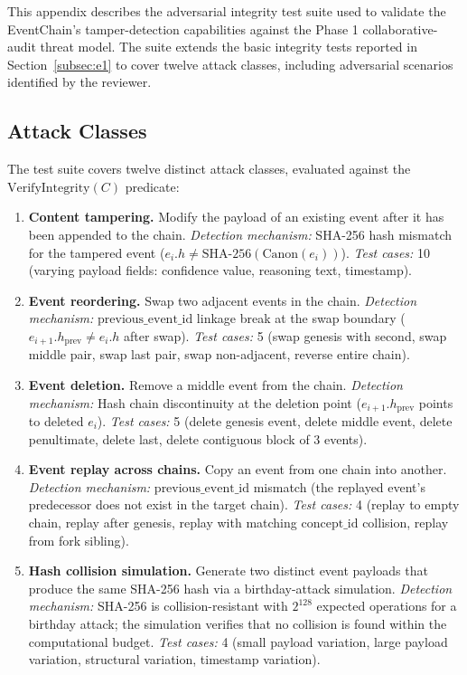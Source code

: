 This appendix describes the adversarial integrity test suite used to validate the EventChain's tamper-detection capabilities against the Phase 1 collaborative-audit threat model. The suite extends the basic integrity tests reported in Section~\ref{subsec:e1} to cover twelve attack classes, including adversarial scenarios identified by the reviewer.

\subsection{Attack Classes}

The test suite covers twelve distinct attack classes, evaluated against the $\text{VerifyIntegrity}(C)$ predicate:

\begin{enumerate}[label=\textbf{A\arabic*}, leftmargin=3em]
    \item \textbf{Content tampering.} Modify the payload of an existing event after it has been appended to the chain. \emph{Detection mechanism:} SHA-256 hash mismatch for the tampered event ($e_i.h \neq \text{SHA-256}(\text{Canon}(e_i))$). \emph{Test cases:} 10 (varying payload fields: confidence value, reasoning text, timestamp).

    \item \textbf{Event reordering.} Swap two adjacent events in the chain. \emph{Detection mechanism:} $\text{previous\_event\_id}$ linkage break at the swap boundary ($e_{i+1}.h_{\text{prev}} \neq e_i.h$ after swap). \emph{Test cases:} 5 (swap genesis with second, swap middle pair, swap last pair, swap non-adjacent, reverse entire chain).

    \item \textbf{Event deletion.} Remove a middle event from the chain. \emph{Detection mechanism:} Hash chain discontinuity at the deletion point ($e_{i+1}.h_{\text{prev}}$ points to deleted $e_i$). \emph{Test cases:} 5 (delete genesis event, delete middle event, delete penultimate, delete last, delete contiguous block of 3 events).

    \item \textbf{Event replay across chains.} Copy an event from one chain into another. \emph{Detection mechanism:} $\text{previous\_event\_id}$ mismatch (the replayed event's predecessor does not exist in the target chain). \emph{Test cases:} 4 (replay to empty chain, replay after genesis, replay with matching $\text{concept\_id}$ collision, replay from fork sibling).

    \item \textbf{Hash collision simulation.} Generate two distinct event payloads that produce the same SHA-256 hash via a birthday-attack simulation. \emph{Detection mechanism:} SHA-256 is collision-resistant with $2^{128}$ expected operations for a birthday attack; the simulation verifies that no collision is found within the computational budget. \emph{Test cases:} 4 (small payload variation, large payload variation, structural variation, timestamp variation).


\end{enumerate}
